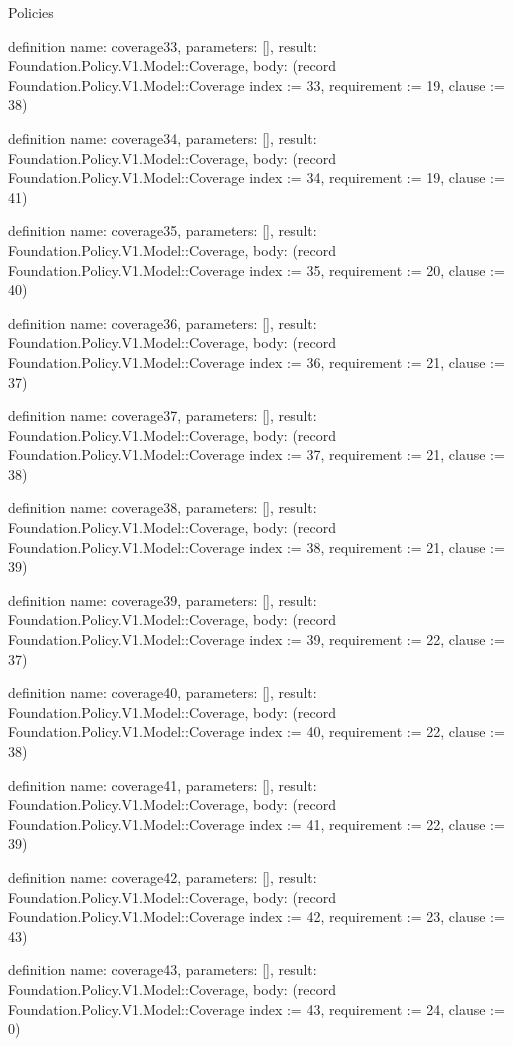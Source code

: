 \begin{lexlean}{Policies}
\begin{semanticmodule}
definition{
  name: coverage33,
  parameters: [],
  result: Foundation.Policy.V1.Model::Coverage,
  body: (record Foundation.Policy.V1.Model::Coverage {index := 33, requirement := 19, clause := 38})
}

definition{
  name: coverage34,
  parameters: [],
  result: Foundation.Policy.V1.Model::Coverage,
  body: (record Foundation.Policy.V1.Model::Coverage {index := 34, requirement := 19, clause := 41})
}

definition{
  name: coverage35,
  parameters: [],
  result: Foundation.Policy.V1.Model::Coverage,
  body: (record Foundation.Policy.V1.Model::Coverage {index := 35, requirement := 20, clause := 40})
}

definition{
  name: coverage36,
  parameters: [],
  result: Foundation.Policy.V1.Model::Coverage,
  body: (record Foundation.Policy.V1.Model::Coverage {index := 36, requirement := 21, clause := 37})
}

definition{
  name: coverage37,
  parameters: [],
  result: Foundation.Policy.V1.Model::Coverage,
  body: (record Foundation.Policy.V1.Model::Coverage {index := 37, requirement := 21, clause := 38})
}

definition{
  name: coverage38,
  parameters: [],
  result: Foundation.Policy.V1.Model::Coverage,
  body: (record Foundation.Policy.V1.Model::Coverage {index := 38, requirement := 21, clause := 39})
}

definition{
  name: coverage39,
  parameters: [],
  result: Foundation.Policy.V1.Model::Coverage,
  body: (record Foundation.Policy.V1.Model::Coverage {index := 39, requirement := 22, clause := 37})
}

definition{
  name: coverage40,
  parameters: [],
  result: Foundation.Policy.V1.Model::Coverage,
  body: (record Foundation.Policy.V1.Model::Coverage {index := 40, requirement := 22, clause := 38})
}

definition{
  name: coverage41,
  parameters: [],
  result: Foundation.Policy.V1.Model::Coverage,
  body: (record Foundation.Policy.V1.Model::Coverage {index := 41, requirement := 22, clause := 39})
}

definition{
  name: coverage42,
  parameters: [],
  result: Foundation.Policy.V1.Model::Coverage,
  body: (record Foundation.Policy.V1.Model::Coverage {index := 42, requirement := 23, clause := 43})
}

definition{
  name: coverage43,
  parameters: [],
  result: Foundation.Policy.V1.Model::Coverage,
  body: (record Foundation.Policy.V1.Model::Coverage {index := 43, requirement := 24, clause := 0})
}


\end{semanticmodule}
\end{lexlean}
